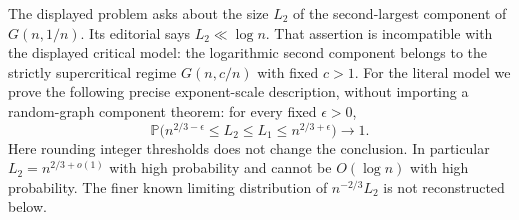 The displayed problem asks about the size $L_2$ of the second-largest component of $G(n,1/n)$. Its editorial says $L_2\ll\log n$. That assertion is incompatible with the displayed critical model: the logarithmic second component belongs to the strictly supercritical regime $G(n,c/n)$ with fixed $c>1$.
For the literal model we prove the following precise exponent-scale description, without importing a random-graph component theorem: for every fixed $\epsilon>0$,
\[
 \mathbb P\bigl(n^{2/3-\epsilon}\le L_2\le L_1\le n^{2/3+\epsilon}\bigr)\longrightarrow1. \tag{1}
\]
Here rounding integer thresholds does not change the conclusion. In particular $L_2=n^{2/3+o(1)}$ with high probability and cannot be $O(\log n)$ with high probability. The finer known limiting distribution of $n^{-2/3}L_2$ is not reconstructed below.

